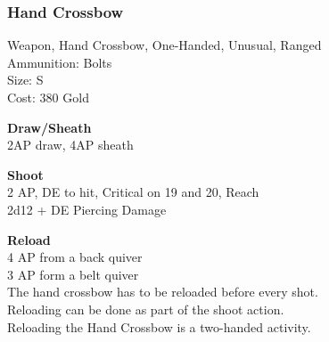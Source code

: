 \subsubsection{Hand Crossbow}\label{weapon:handCrossbow}
Weapon, Hand Crossbow, One-Handed, Unusual, Ranged\\
Ammunition: Bolts\\
Size: S\\
Cost: 380 Gold

\textbf{Draw/Sheath} \\
2AP draw, 4AP sheath

\textbf{Shoot} \\
2 AP, DE to hit, Critical on 19 and 20,  Reach\\
2d12 + \texttimes DE Piercing Damage

\textbf{Reload} \\
4 AP from a back quiver\\
3 AP form a belt quiver\\
The hand crossbow has to be reloaded before every shot.\\
Reloading can be done as part of the shoot action.\\
Reloading the Hand Crossbow is a two-handed activity.

